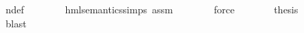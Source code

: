 \begin{isabellebody}
\ n{\isasymphi}{\isacharunderscore}{\kern0pt}def\isanewline
\ \ \ \ \ \ \isamarkupfalse%
\ hml{\isacharunderscore}{\kern0pt}semantics{\isachardot}{\kern0pt}simps\ assm\isanewline
\ \ \ \ \ \ \isamarkupfalse%
\ force\isanewline
\ \ \ \ \isamarkupfalse%
\ \isamarkupfalse%
\ {\isacharquery}{\kern0pt}thesis\isanewline
\ \ \ \ \ \ \isamarkupfalse%
\ blast\isanewline
\ \ \isamarkupfalse%
\isanewline
{}\isamarkupfalse%
%
\endisatagproof
{\isafoldproof}%
%
\isadelimproof
\isanewline
%
\endisadelimproof
\isanewline
{}\isamarkupfalse%
\ \isanewline
%
\isadelimtheory
%
\endisadelimtheory
%
\isatagtheory
{}\isamarkupfalse%
%
\endisatagtheory
{\isafoldtheory}%
%
\isadelimtheory
%
\endisadelimtheory
%
\end{isabellebody}%
\endinput
